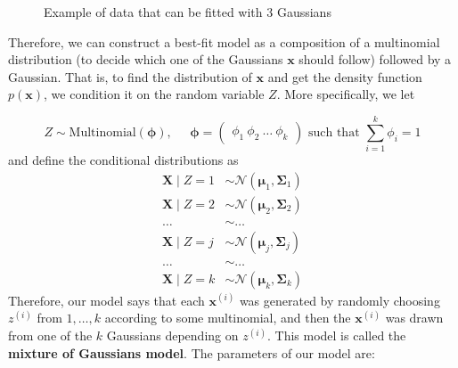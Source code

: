 \begin{figure}[H]
        \caption{Example of data that can be fitted with 3 Gaussians}
      \end{figure}

      Therefore, we can construct a best-fit model as a composition of a multinomial distribution (to decide which one of the Gaussians $\mathbf{x}$ should follow) followed by a Gaussian. That is, to find the distribution of $\mathbf{x}$ and get the density function $p(\mathbf{x})$, we condition it on the random variable $Z$. More specifically, we let

      \[Z \sim \text{Multinomial}(\boldsymbol{\phi}), \;\;\;\;\; \boldsymbol{\phi} = \begin{pmatrix} \phi_1 \ \phi_2 \ \ldots \ \phi_k \end{pmatrix} \text{ such that } \sum_{i=1}^k \phi_i = 1\]
      and define the conditional distributions as
      \begin{align*}
        \mathbf{X} \mid Z = 1 & \sim \mathcal{N}(\boldsymbol{\mu}_1, \boldsymbol{\Sigma}_1) \\
        \mathbf{X} \mid Z = 2 & \sim \mathcal{N}(\boldsymbol{\mu}_2, \boldsymbol{\Sigma}_2) \\
        \ldots & \sim \ldots \\
        \mathbf{X} \mid Z = j & \sim \mathcal{N}(\boldsymbol{\mu}_j, \boldsymbol{\Sigma}_j) \\
        \ldots & \sim \ldots \\
        \mathbf{X} \mid Z = k & \sim \mathcal{N}(\boldsymbol{\mu}_k, \boldsymbol{\Sigma}_k)
      \end{align*}
      Therefore, our model says that each $\mathbf{x}^{(i)}$ was generated by randomly choosing $z^{(i)}$ from ${1, \ldots, k}$ according to some multinomial, and then the $\mathbf{x}^{(i)}$ was drawn from one of the $k$ Gaussians depending on $z^{(i)}$. This model is called the \textbf{mixture of Gaussians model}. The parameters of our model are: 

